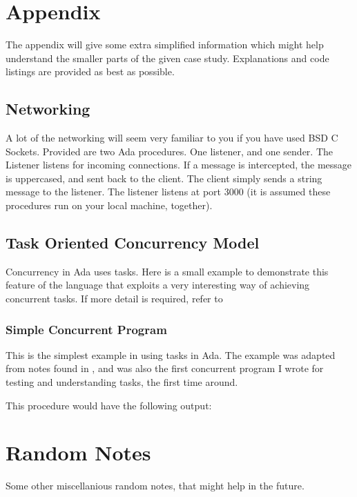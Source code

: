 \section{Appendix}
The appendix will give some extra simplified information which might help understand the smaller parts of the given case study. Explanations and code listings are provided as best as possible.

\subsection{Networking}
A lot of the networking will seem very familiar to you if you have used BSD C Sockets. Provided are two Ada procedures. One listener, and one sender. The Listener listens for incoming connections. If a message is intercepted, the message is uppercased, and sent back to the client. 
The client simply sends a string message to the listener. The listener listens at port 3000 (it is assumed these procedures run on your local machine, together).




\subsection{Task Oriented Concurrency Model}
Concurrency in Ada uses tasks. Here is a small example to demonstrate this feature of the language that exploits a very interesting way of achieving concurrent tasks. If more detail is required, refer to \cite{AdaTasking}

\subsubsection{Simple Concurrent Program}
This is the simplest example in using tasks in Ada. The example was adapted from notes found in \cite{AdaConcurrent}, and was also the first concurrent program I wrote for testing and understanding tasks, the first time around.


This procedure would have the following output:


\section{Random Notes}
Some other miscellanious random notes, that might help in the future. 

